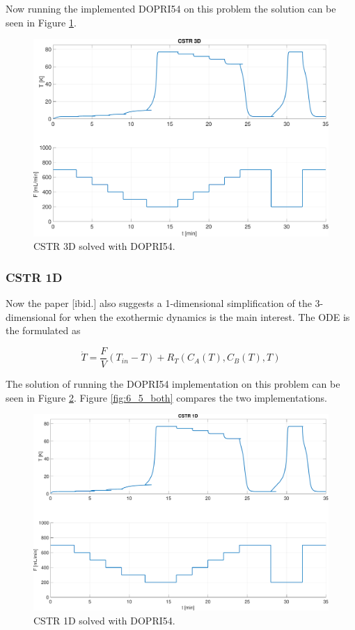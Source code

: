 Now running the implemented DOPRI54 on this problem the solution can be seen in Figure \ref{fig:6_5_3d}.


\begin{figure}[h]
    \centering
    \includegraphics[width=\textwidth]{plots/6_5_3D.pdf}
    \caption{CSTR 3D solved with DOPRI54.}
    \label{fig:6_5_3d}
\end{figure}



\subsubsection*{CSTR 1D}
Now the paper [ibid.] also suggests a 1-dimensional simplification of the 3-dimensional for when the exothermic dynamics is the main interest. The ODE is the formulated as

\begin{equation}
\dot{T}=\frac{F}{V}\left(T_{i n}-T\right)+R_{T}\left(C_{A}(T), C_{B}(T), T\right)
\end{equation}

The solution of running the DOPRI54 implementation on this problem can be seen in Figure \ref{fig:6_5_1d}. Figure \ref{fig:6_5_both} compares the two implementations.
\begin{figure}[h]
    \centering
    \includegraphics[width=\textwidth]{plots/6_5_1D.pdf}
    \caption{CSTR 1D solved with DOPRI54.}
    \label{fig:6_5_1d}
\end{figure}

